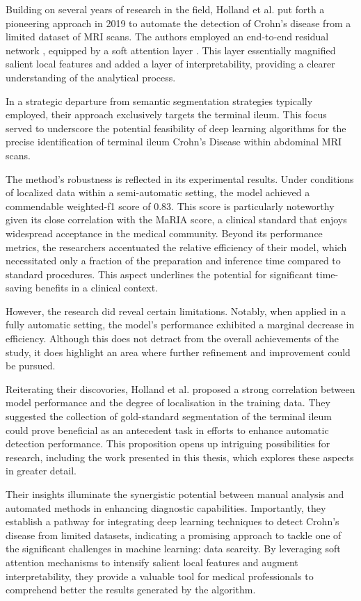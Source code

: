 Building on several years of research in the field, Holland et al. \cite{holland2019automatic} put forth a pioneering approach in 2019 to automate the detection of Crohn's disease from a limited dataset of MRI scans. The authors employed an end-to-end residual network \cite{he2016deep}, equipped by a soft attention layer \cite{schlemper2019attention}. This layer essentially magnified salient local features and added a layer of interpretability, providing a clearer understanding of the analytical process.

In a strategic departure from semantic segmentation strategies typically employed, their approach exclusively targets the terminal ileum. This focus served to underscore the potential feasibility of deep learning algorithms for the precise identification of terminal ileum Crohn's Disease within abdominal MRI scans.

The method's robustness is reflected in its experimental results. Under conditions of localized data within a semi-automatic setting, the model achieved a commendable weighted-f1 score of 0.83. This score is particularly noteworthy given its close correlation with the MaRIA \cite{rimola2009magnetic} score, a clinical standard that enjoys widespread acceptance in the medical community. Beyond its performance metrics, the researchers accentuated the relative efficiency of their model, which necessitated only a fraction of the preparation and inference time compared to standard procedures. This aspect underlines the potential for significant time-saving benefits in a clinical context.

However, the research did reveal certain limitations. Notably, when applied in a fully automatic setting, the model's performance exhibited a marginal decrease in efficiency. Although this does not detract from the overall achievements of the study, it does highlight an area where further refinement and improvement could be pursued.

Reiterating their discovories, Holland et al. proposed a strong correlation between model performance and the degree of localisation in the training data. They suggested the collection of gold-standard segmentation of the terminal ileum could prove beneficial as an antecedent task in efforts to enhance automatic detection performance. This proposition opens up intriguing possibilities for research, including the work presented in this thesis, which explores these aspects in greater detail.

Their insights illuminate the synergistic potential between manual analysis and automated methods in enhancing diagnostic capabilities. Importantly, they establish a pathway for integrating deep learning techniques to detect Crohn's disease from limited datasets, indicating a promising approach to tackle one of the significant challenges in machine learning: data scarcity. By leveraging soft attention mechanisms to intensify salient local features and augment interpretability, they provide a valuable tool for medical professionals to comprehend better the results generated by the algorithm.

